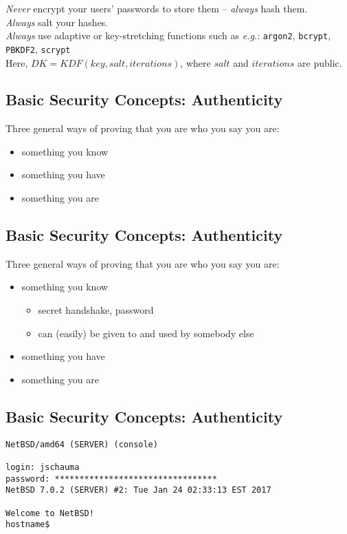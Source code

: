 \documentclass[xga]{xdvislides}
\begin{document}
{\em Never} encrypt your users' passwords to store them -- {\em always} hash them. \\

\addvspace{.25in}
{\em Always} salt your hashes. \\

{\em Always} use adaptive or key-stretching functions
such as {\em e.g.}: {\tt argon2}, {\tt bcrypt}, {\tt PBKDF2}, {\tt scrypt} \\

Here, $DK = KDF(key, salt, iterations)$, where $salt$
and $iterations$ are public.

\subsection{Basic Security Concepts: Authenticity}
Three general ways of proving that you are who you say you are:
\begin{itemize}
	\item something you know
	\item something you have
	\item something you are
\end{itemize}

\subsection{Basic Security Concepts: Authenticity}
Three general ways of proving that you are who you say you are:
\begin{itemize}
	\item something you know
		\begin{itemize}
			\item secret handshake, password
			\item can (easily) be given to and used by somebody else
		\end{itemize}
	\item something you have
	\item something you are
\end{itemize}

\subsection{Basic Security Concepts: Authenticity}
\begin{verbatim}
NetBSD/amd64 (SERVER) (console)

login: jschauma
password: *********************************
NetBSD 7.0.2 (SERVER) #2: Tue Jan 24 02:33:13 EST 2017

Welcome to NetBSD!
hostname$ 
\end{verbatim}
\end{document}
